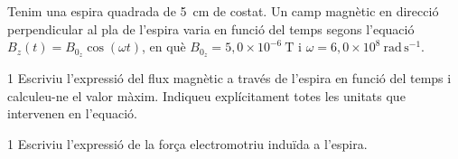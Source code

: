 Tenim una espira quadrada de 5~cm de costat. Un camp magnètic en direcció perpendicular al pla de l'espira varia en funció del temps segons l'equació $B_z(t) = B_{0_z}\cos(\omega t)$, en què $B_{0_z} = 5,0\times 10^{-6}\ \mathrm{T}$ i $\omega = 6,0\times 10^{8}\ \mathrm{rad\,s^{-1}}$.


\begin{apartat}{1}
Escriviu l'expressió del flux magnètic a través de l'espira en funció del temps i calculeu-ne el valor màxim. Indiqueu explícitament totes les unitats que intervenen en l'equació.
\end{apartat}

\begin{apartat}{1}
Escriviu l'expressió de la força electromotriu induïda a l'espira.
\end{apartat}
